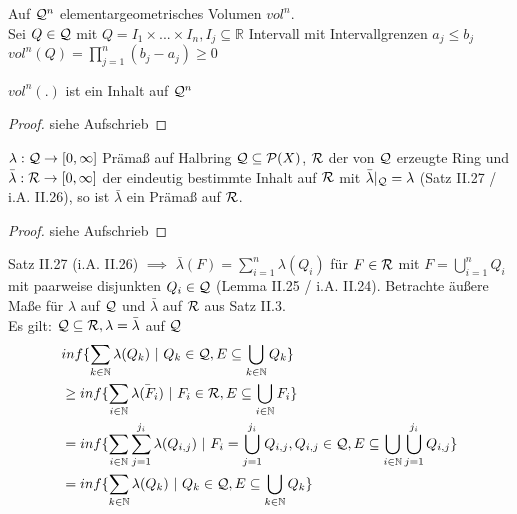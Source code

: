 \documentclass[11pt,a4paper,fleqn,openany]{report}
\begin{document}
    \begin{example}
      Auf $\mathcal{Q}^n$ elementargeometrisches Volumen $vol^n$.\\
      Sei $Q \in \mathcal{Q}$ mit $Q = I_1 \times ... \times I_n, I_j \subseteq \mathbb{R}$ Intervall mit Intervallgrenzen $a_j \leq b_j$\\
      $vol^n(Q) = \prod\limits_{j=1}^n (b_j - a_j) \geq 0$
    \end{example}

    \begin{theorem}[i.A. II.28]
      $vol^n(.)$ ist ein Inhalt auf $\mathcal{Q}^n$
    \end{theorem}

    \begin{proof}
      siehe Aufschrieb
    \end{proof}

    \begin{theorem}[i.A. II.29]
      $\lambda: \mathcal{Q} \to [0, \infty]$ Prämaß auf Halbring $\mathcal{Q} \subseteq \mathcal{P}(X)$, $\mathcal{R}$ der von $\mathcal{Q}$ erzeugte Ring und $\bar{\lambda}: \mathcal{R} \to [0,\infty]$ der eindeutig bestimmte Inhalt auf $\mathcal{R}$ mit $\bar{\lambda}|_{\mathcal{Q}}=\lambda$ (Satz II.27 / i.A. II.26), so ist $\bar{\lambda}$ ein Prämaß auf $\mathcal{R}$.
    \end{theorem}

    \begin{proof}
      siehe Aufschrieb
    \end{proof}

    
    \begin{remark}
      Satz II.27 (i.A. II.26) $\implies$ $\bar{\lambda}(F) = \sum\limits_{i=1}^n \lambda(Q_i)$ für $F \in \mathcal{R}$ mit $F=\bigcup\limits_{i=1}^n Q_i$ mit paarweise disjunkten $Q_i \in \mathcal{Q}$ (Lemma II.25 / i.A. II.24). Betrachte äußere Maße für $\lambda$ auf $\mathcal{Q}$ und $\bar{\lambda}$ auf $\mathcal{R}$ aus Satz II.3.\\
      Es gilt: $\mathcal{Q} \subseteq \mathcal{R}, \lambda = \bar{\lambda}$ auf $\mathcal{Q}$
      \begin{align*}
        & inf\{\sum\limits_{k \in \mathbb{N}} \lambda(Q_k) \ | \ Q_k \in \script{Q}, E \subseteq \bigcup\limits_{k \in \mathbb{N}} Q_k\}\\
        &\geq inf\{\sum\limits_{i \in \mathbb{N}} \bar{\lambda(F_i)} \ | \ F_i \in \script{R}, E \subseteq \bigcup\limits_{i \in \mathbb{N}} F_i\}\\
        &= inf\{ \sum\limits_{i \in \mathbb{N}} \sum\limits_{j=1}^{j_i} \lambda(Q_{i,j}) \ | \ F_i = \bigcup\limits_{j=1}^{j_i} Q_{i,j}, Q_{i,j} \in \script{Q}, E \subseteq \bigcup\limits_{i \in \mathbb{N}} \bigcup\limits_{j=1}^{j_i} Q_{i,j}\}\\
        &= inf\{\sum\limits_{k \in \mathbb{N}} \lambda(Q_k) \ | \ Q_k \in \script{Q}, E \subseteq \bigcup\limits_{k \in \mathbb{N}} Q_k\}
      \end{align*}
    \end{remark}
\end{document}
